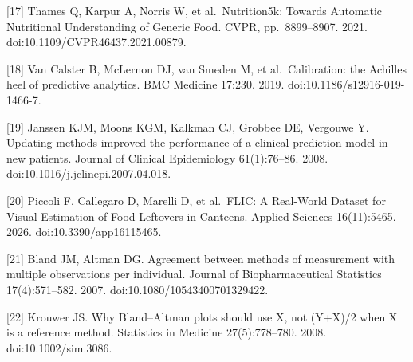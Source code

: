 \documentclass[
  11pt,
  letterpaper]{article}
\begin{document}
{[}17{]} Thames Q, Karpur A, Norris W, et al.~Nutrition5k: Towards Automatic Nutritional Understanding of
Generic Food. CVPR, pp.~8899--8907. 2021. doi:10.1109/CVPR46437.2021.00879.

{[}18{]} Van Calster B, McLernon DJ, van Smeden M, et al.~Calibration: the Achilles heel of predictive
analytics. BMC Medicine 17:230. 2019. doi:10.1186/s12916-019-1466-7.

{[}19{]} Janssen KJM, Moons KGM, Kalkman CJ, Grobbee DE, Vergouwe Y. Updating methods improved the performance
of a clinical prediction model in new patients. Journal of Clinical Epidemiology 61(1):76--86. 2008.
doi:10.1016/j.jclinepi.2007.04.018.

{[}20{]} Piccoli F, Callegaro D, Marelli D, et al.~FLIC: A Real-World Dataset for Visual Estimation of Food
Leftovers in Canteens. Applied Sciences 16(11):5465. 2026. doi:10.3390/app16115465.

{[}21{]} Bland JM, Altman DG. Agreement between methods of measurement with multiple observations per
individual. Journal of Biopharmaceutical Statistics 17(4):571--582. 2007. doi:10.1080/10543400701329422.

{[}22{]} Krouwer JS. Why Bland--Altman plots should use X, not (Y+X)/2 when X is a reference method.
Statistics in Medicine 27(5):778--780. 2008. doi:10.1002/sim.3086.
\end{document}
